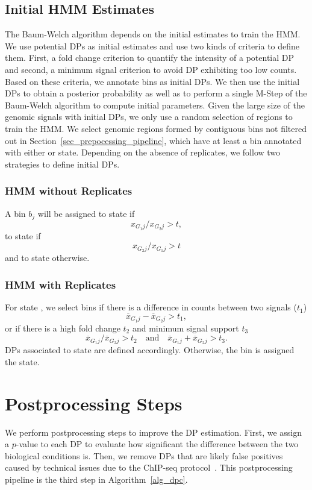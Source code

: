 \subsection{Initial HMM Estimates}
The Baum-Welch algorithm depends on the initial estimates to train the HMM.
We use potential DPs as initial estimates and use two kinds of criteria to define them.
First, a fold change criterion to quantify the intensity of a potential DP and second, a minimum signal criterion to avoid DP exhibiting too low counts.
Based on these criteria, we annotate bins as initial DPs.
We then use the initial DPs to obtain a posterior probability as well as to perform a single M-Step of the Baum-Welch algorithm to compute initial parameters.
Given the large size of the genomic signals with initial DPs, we only use a random selection of regions to train the HMM. 
We select genomic regions formed by contiguous bins not filtered out in Section~\ref{sec_prepocessing_pipeline}, which have at least a bin annotated with either  or  state. 
Depending on the absence of replicates, we follow two strategies to define initial DPs.

\subsubsection{HMM without Replicates}
A bin $b_j$ will be assigned to state  if 
$$x_{G_1j} / x_{G_2j} > t,$$
to state  if 
$$ x_{G_2j} / x_{G_1j} > t$$
and to  state otherwise. 



\subsubsection{HMM with Replicates}
\label{sec_initial_hmm_with_rep}
For state , we select bins if there is a difference in counts between two signals ($t_1$)
$$\overline{x}_{G_1j} - \overline{x}_{G_2j} > t_1,$$
\noindent 
or if there is a high fold change $t_2$ and minimum signal support $t_3$
$$\overline{x}_{G_1j} / \overline{x}_{G_2j} > t_2 \quad \text{and} \quad \overline{x}_{G_1j} + \overline{x}_{G_2j} > t_3.$$
DPs associated to state  are defined accordingly. 
Otherwise, the bin is assigned the  state.

\section{Postprocessing Steps}
\label{sec_postpocessing_pipeline}
We perform postprocessing steps to improve the DP estimation. 
First, we assign a $p$-value to each DP to evaluate how significant the difference between the two biological conditions is.
Then, we remove DPs that are likely false positives caused by technical issues due to the ChIP-seq protocol~\citep{Pepke2009}.
This postprocessing pipeline is the third step in Algorithm~\ref{alg_dpc}.

